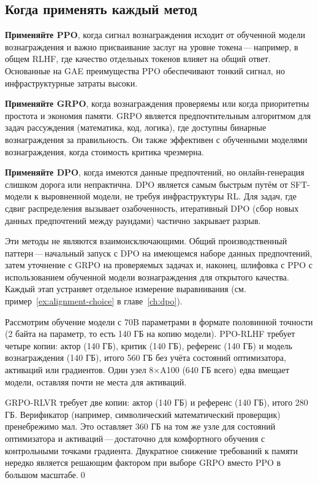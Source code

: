 \subsection{Когда применять каждый метод}

\textbf{Применяйте PPO}, когда сигнал вознаграждения исходит от обученной модели вознаграждения и важно присваивание заслуг на уровне токена\,---\,например, в общем RLHF, где качество отдельных токенов влияет на общий ответ. Основанные на GAE преимущества PPO обеспечивают тонкий сигнал, но инфраструктурные затраты высоки.

\textbf{Применяйте GRPO}, когда вознаграждения проверяемы или когда приоритетны простота и экономия памяти. GRPO является предпочтительным алгоритмом для задач рассуждения (математика, код, логика), где доступны бинарные вознаграждения за правильность. Он также эффективен с обученными моделями вознаграждения, когда стоимость критика чрезмерна.

\textbf{Применяйте DPO}, когда имеются данные предпочтений, но онлайн-генерация слишком дорога или непрактична. DPO является самым быстрым путём от SFT-модели к выровненной модели, не требуя инфраструктуры RL. Для задач, где сдвиг распределения вызывает озабоченность, итеративный DPO (сбор новых данных предпочтений между раундами) частично закрывает разрыв.

\begin{remark}
Эти методы не являются взаимоисключающими. Общий производственный паттерн\,---\,начальный запуск с DPO на имеющемся наборе данных предпочтений, затем уточнение с GRPO на проверяемых задачах и, наконец, шлифовка с PPO с использованием обученной модели вознаграждения для открытого качества. Каждый этап устраняет отдельное измерение выравнивания (см. пример~\ref{ex:alignment-choice} в главе~\ref{ch:dpo}).
\end{remark}

\begin{example}
\label{ex:grpo-memory}
Рассмотрим обучение модели с 70B параметрами в формате половинной точности (2 байта на параметр, то есть 140 ГБ на копию модели). PPO-RLHF требует четыре копии: актор (140 ГБ), критик (140 ГБ), референс (140 ГБ) и модель вознаграждения (140 ГБ), итого 560 ГБ без учёта состояний оптимизатора, активаций или градиентов. Один узел 8$\times$A100 (640 ГБ всего) едва вмещает модели, оставляя почти не места для активаций.

GRPO-RLVR требует две копии: актор (140 ГБ) и референс (140 ГБ), итого 280 ГБ. Верификатор (например, символический математический проверщик) пренебрежимо мал. Это оставляет 360 ГБ на том же узле для состояний оптимизатора и активаций\,---\,достаточно для комфортного обучения с контрольными точками градиента. Двукратное снижение требований к памяти нередко является решающим фактором при выборе GRPO вместо PPO в большом масштабе.\qed
\end{example}

